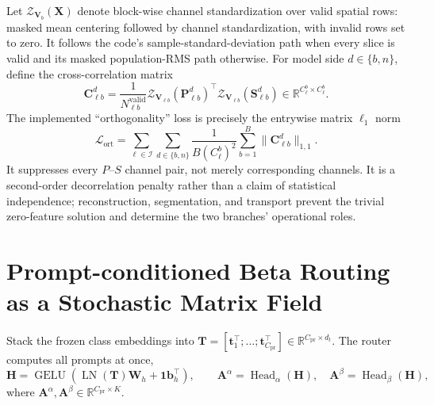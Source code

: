 \documentclass[10pt]{article}
\newcommand{\R}{\mathbb{R}}
\newcommand{\cI}{\mathcal{I}}
\newcommand{\cL}{\mathcal{L}}
\newcommand{\ones}{\bm{1}}
\newcommand{\LN}{\operatorname{LN}}
\newcommand{\GELU}{\operatorname{GELU}}
\begin{document}
Let $\mathcal Z_{\bm V_b}(\bm X)$ denote block-wise channel standardization over
valid spatial rows: masked mean centering followed by channel standardization,
with invalid rows set to zero.  It follows the code's sample-standard-deviation
path when every slice is valid and its masked population-RMS path otherwise.
For model side $d\in\{b,n\}$, define the cross-correlation matrix
\begin{equation}
    \bm C^{d}_{\ell b}
    =\frac{1}{N_{\ell b}^{\mathrm{valid}}}
      \mathcal Z_{\bm V_{\ell b}}(\bm P^d_{\ell b})^{\!\top}
      \mathcal Z_{\bm V_{\ell b}}(\bm S^d_{\ell b})
      \in\R^{C^b_\ell\times C^b_\ell}.
\end{equation}
The implemented ``orthogonality'' loss is precisely the entrywise matrix
$\ell_1$ norm
\begin{equation}
    \boxed{
    \cL_{\mathrm{ort}}
    =\sum_{\ell\in\cI}\sum_{d\in\{b,n\}}
      \frac{1}{B(C^b_\ell)^2}
      \sum_{b=1}^{B}\|\bm C^{d}_{\ell b}\|_{1,1}.}
    \label{eq:matrix-separation}
\end{equation}
It suppresses every $P$--$S$ channel pair, not merely corresponding channels.
It is a second-order decorrelation penalty rather than a claim of statistical
independence; reconstruction, segmentation, and transport prevent the trivial
zero-feature solution and determine the two branches' operational roles.

\section{Prompt-conditioned Beta Routing as a Stochastic Matrix Field}

Stack the frozen class embeddings into
$\bm T=[\bm t_1^\top;\ldots;\bm t_{C_{\mathrm{pr}}}^\top]
\in\R^{C_{\mathrm{pr}}\times d_t}$.  The router computes all prompts at once,
\begin{equation}
    \bm H=\GELU\!\left(\LN(\bm T)\bm W_h
       +\ones\bm b_h^\top\right),
    \qquad
    \bm A^\alpha=\operatorname{Head}_\alpha(\bm H),\quad
    \bm A^\beta=\operatorname{Head}_\beta(\bm H),
    \label{eq:router-coefficients}
\end{equation}
where $\bm A^\alpha,\bm A^\beta\in\R^{C_{\mathrm{pr}}\times K}$.
\end{document}
